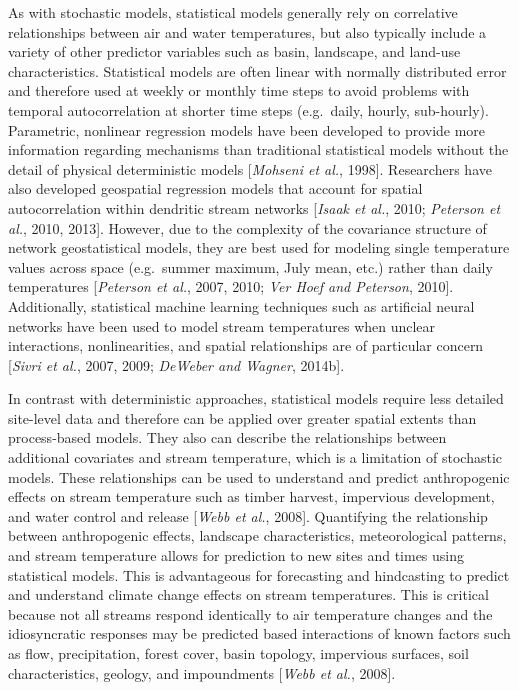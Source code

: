 As with stochastic models, statistical models generally rely on
correlative relationships between air and water temperatures, but also
typically include a variety of other predictor variables such as basin,
landscape, and land-use characteristics. Statistical models are often
linear with normally distributed error and therefore used at weekly or
monthly time steps to avoid problems with temporal autocorrelation at
shorter time steps (e.g.~daily, hourly, sub-hourly). Parametric,
nonlinear regression models have been developed to provide more
information regarding mechanisms than traditional statistical models
without the detail of physical deterministic models {[}\emph{Mohseni et
al.}, 1998{]}. Researchers have also developed geospatial regression
models that account for spatial autocorrelation within dendritic stream
networks {[}\emph{Isaak et al.}, 2010; \emph{Peterson et al.}, 2010,
2013{]}. However, due to the complexity of the covariance structure of
network geostatistical models, they are best used for modeling single
temperature values across space (e.g.~summer maximum, July mean, etc.)
rather than daily temperatures {[}\emph{Peterson et al.}, 2007, 2010;
\emph{Ver Hoef and Peterson}, 2010{]}. Additionally, statistical machine
learning techniques such as artificial neural networks have been used to
model stream temperatures when unclear interactions, nonlinearities, and
spatial relationships are of particular concern {[}\emph{Sivri et al.},
2007, 2009; \emph{DeWeber and Wagner}, 2014b{]}.

In contrast with deterministic approaches, statistical models require
less detailed site-level data and therefore can be applied over greater
spatial extents than process-based models. They also can describe the
relationships between additional covariates and stream temperature,
which is a limitation of stochastic models. These relationships can be
used to understand and predict anthropogenic effects on stream
temperature such as timber harvest, impervious development, and water
control and release {[}\emph{Webb et al.}, 2008{]}. Quantifying the
relationship between anthropogenic effects, landscape characteristics,
meteorological patterns, and stream temperature allows for prediction to
new sites and times using statistical models. This is advantageous for
forecasting and hindcasting to predict and understand climate change
effects on stream temperatures. This is critical because not all streams
respond identically to air temperature changes and the idiosyncratic
responses may be predicted based interactions of known factors such as
flow, precipitation, forest cover, basin topology, impervious surfaces,
soil characteristics, geology, and impoundments {[}\emph{Webb et al.},
2008{]}.

